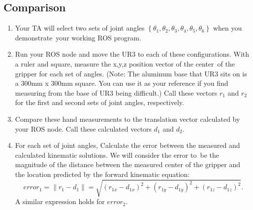 \subsection{Comparison}
\begin{enumerate}
\item Your TA will select two sets of joint angles $\left\{\theta_1,\theta_2,\theta_3,\theta_4,\theta_5,\theta_6\right\}$ when you demonstrate\
your working ROS program.  
\item Run your ROS node and move the UR3 to each of these configurations.  With a ruler and square, measure the x,y,z position vector of the center\
of the gripper for each set of angles. (Note: The aluminum base that UR3 sits on is a 300mm x 300mm square. You can use it as your reference if you find measuring from the base of UR3 being difficult.)  Call these vectors $r_1$ and $r_2$ for the first and second sets of joint angles, respectively.

\item Compare these hand measurements to the translation vector calculated by your ROS node.  
Call these calculated vectors $d_1$ and $d_2$.	

\item For each set of joint angles, Calculate the error between the measured and calculated kinematic solutions.  We will consider the error to\
be the magnitude of the distance between the measured center of the gripper and the location predicted by the forward kinematic equation:
\[
error_1 = \left\| r_1 - d_1 \right\| = \sqrt{(r_{1x}-d_{1x})^2 + (r_{1y}-d_{1y})^2 + (r_{1z}-d_{1z})^2}.
\]
A similar expression holds for $error_2$.
\end{enumerate}

